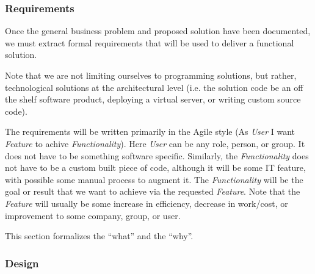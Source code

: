 \subsubsection{Requirements}
Once the general business problem and proposed solution have been documented, we 
must extract formal requirements that will be used to deliver a functional solution.

Note that we are not limiting ourselves to programming solutions, but rather, 
technological solutions at the architectural level (i.e. the solution code be an off
the shelf software product, deploying a virtual server, or writing custom source code).

The requirements will be written primarily in the Agile style (As {\emph{User}} 
I want {\emph{Feature}} to achive {\emph{Functionality}}).  Here \emph{User} can 
be any role, person, or group.  It does not have to be something software specific.
Similarly, the \emph{Functionality} does not have to be a custom built piece of 
code, although it will be some IT feature, with possible some manual process to
augment it.  The \emph{Functionality} will be the goal or result that we want to 
achieve via the requested \emph{Feature}.  Note that the \emph{Feature} will 
usually be some increase in efficiency, decrease in work/cost, or improvement
to some company, group, or user.

This section formalizes the ``what'' and the ``why''.

\subsubsection{Design}

